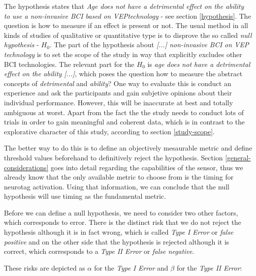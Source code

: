             The hypothesis states that \textit{Age does not have a detrimental effect on the ability to use a non-invasive BCI based on VEPtechnology} - see section \ref{hypothesis}. The question is how to measure if an effect is present or not. The usual method in all kinds of studies of qualitative or quantitative type is to disprove the so called \textit{null hypothesis} - $H_{0}$. The part of the hypothesis about \textit{[...] non-invasive BCI on VEP technology} is to set the scope of the study in way that explicitly excludes other BCI technologies. The relevant part for the $H_{0}$ is \textit{age does not have a detrimental effect on the ability [...]}, which poses the question how to measure the abstract concepts of \textit{detrimental} and \textit{ability}? One way to evaluate this is conduct an experience and ask the participants and gain subjetive opinions about their individual performance. However, this will be inaccurate at best and totally ambiguous at worst. Apart from the fact the the study needs to conduct lots of trials in order to gain meaningful and coherent data, which is in contrast to the explorative character of this study, according to section \ref{study-scope}.

            The better way to do this is to define an objectively mesaurable metric and define threshold values beforehand to definitively reject the hypothesis. Section \ref{general-considerations} goes into detail regarding the capabilities of the sensor, thus we already know that the only available metric to choose from is the timing for neurotag activation. Using that information, we can conclude that the null hypothesis will use timing as the fundamental metric.

            Before we can define a null hypothesis, we need to consider two other factors, which corresponds to error. There is the distinct risk that we do not reject the hypothesis although it is in fact wrong, which is called \textit{Type I Error} or \textit{false positive } and on the other side that the hypothesis is rejected although it is correct, which corresponds to a \textit{Type II Error} or \textit{false negative}. 

            These risks are depicted as $\alpha$ for the \textit{Type I Error} and $\beta$ for the \textit{Type II Error}:

